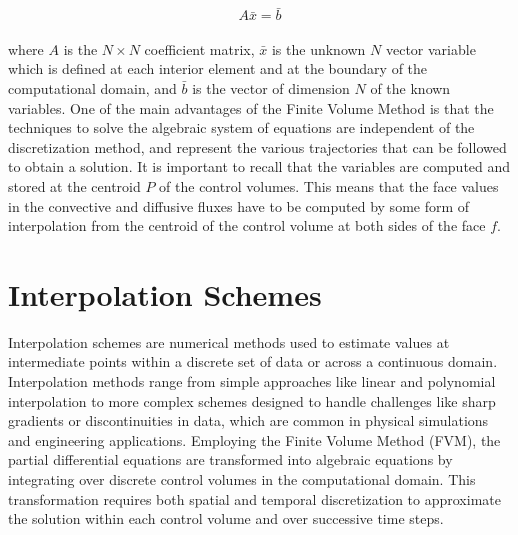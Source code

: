 \documentclass[a5paper]{sapthesis}
\begin{document}
	\begin{equation}
		A\bar{x} = \bar{b}
		\label{matrix form}
	\end{equation}
	\\
	where $A$ is the $N \times N$ coefficient matrix, $\bar{x}$ is the unknown $N$ vector variable which is defined at each interior element and at the boundary of the computational domain, and $\bar{b}$ is the vector of dimension $N$ of the known variables. One of the main advantages of the Finite Volume Method is that the techniques to solve the algebraic system of equations are independent of the discretization method, and represent the various trajectories that can be followed to obtain a solution. 
	It is important to recall that the variables are computed and stored at the centroid $P$ of the control volumes. This means that the face values in the convective and diffusive fluxes have to be computed by some form of interpolation from the centroid of the control volume at both sides of the face $f$.
	
	\section{Interpolation Schemes}
	
	Interpolation schemes are numerical methods used to estimate values at intermediate points within a discrete set of data or across a continuous domain. Interpolation methods range from simple approaches like linear and polynomial interpolation to more complex schemes designed to handle challenges like sharp gradients or discontinuities in data, which are common in physical simulations and engineering applications. Employing the Finite Volume Method (FVM), the partial differential equations are transformed into algebraic equations by integrating over discrete control volumes in the computational domain. This transformation requires both spatial and temporal discretization to approximate the solution within each control volume and over successive time steps.
	
\end{document}
